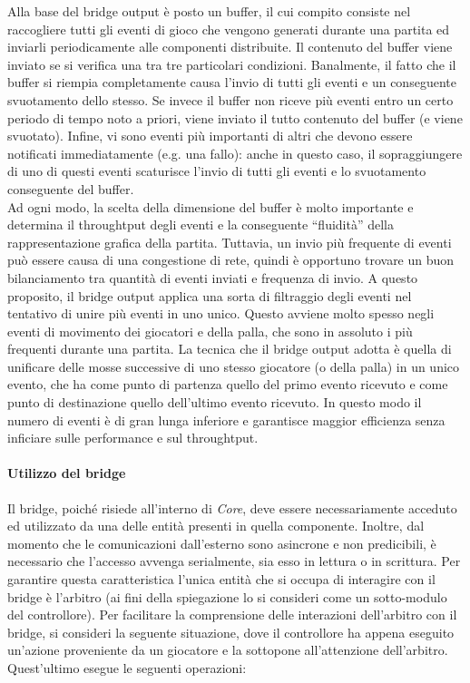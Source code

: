 Alla base del bridge output è posto un buffer, il cui compito consiste nel raccogliere tutti gli eventi di gioco che vengono generati durante una partita ed inviarli periodicamente alle componenti distribuite. Il contenuto del buffer viene inviato se si verifica una tra tre particolari condizioni. Banalmente, il fatto che il buffer si riempia completamente causa l'invio di tutti gli eventi e un conseguente svuotamento dello stesso. Se invece il buffer non riceve più eventi entro un certo periodo di tempo noto a priori, viene inviato il tutto contenuto del buffer (e viene svuotato). Infine, vi sono eventi più importanti di altri che devono essere notificati immediatamente (e.g. una fallo): anche in questo caso, il sopraggiungere di uno di questi eventi scaturisce l'invio di tutti gli eventi e lo svuotamento conseguente del buffer.\\

Ad ogni modo, la scelta della dimensione del buffer è molto importante e determina il throughtput degli eventi e la conseguente ``fluidità'' della rappresentazione grafica della partita. Tuttavia, un invio più frequente di eventi può essere causa di una congestione di rete, quindi è opportuno trovare un buon bilanciamento tra quantità di eventi inviati e frequenza di invio. A questo proposito, il bridge output applica una sorta di filtraggio degli eventi nel tentativo di unire più eventi in uno unico. Questo avviene molto spesso negli eventi di movimento dei giocatori e della palla, che sono in assoluto i più frequenti durante una partita. La tecnica che il bridge output adotta è quella di unificare delle mosse successive di uno stesso giocatore (o della palla) in un unico evento, che ha come punto di partenza quello del primo evento ricevuto e come punto di destinazione quello dell'ultimo evento ricevuto. In questo modo il numero di eventi è di gran lunga inferiore e garantisce maggior efficienza senza inficiare sulle performance e sul throughtput.

\paragraph{Utilizzo del bridge}\label{sec:analisi_distribuzione_bridge_utilizzo} Il bridge, poiché risiede all'interno di \textit{Core}, deve essere necessariamente acceduto ed utilizzato da una delle entità presenti in quella componente. Inoltre, dal momento che le comunicazioni dall'esterno sono asincrone e non predicibili, è necessario che l'accesso avvenga serialmente, sia esso in lettura o in scrittura. Per garantire questa caratteristica l'unica entità che si occupa di interagire con il bridge è l'arbitro (ai fini della spiegazione lo si consideri come un sotto-modulo del controllore). Per facilitare la comprensione delle interazioni dell'arbitro con il bridge, si consideri la seguente situazione, dove il controllore ha appena eseguito un'azione proveniente da un giocatore e la sottopone all'attenzione dell'arbitro. Quest'ultimo esegue le seguenti operazioni:

